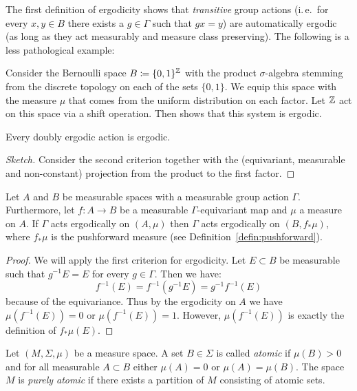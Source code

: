 The first definition of ergodicity shows that \emph{transitive} group actions (i.\,e.\ for every \(x,y \in B\) there exists a \(g \in \Gamma\) such that \(gx = y\)) are automatically ergodic (as long as they act measurably and measure class preserving). The following is a less pathological example:

\begin{bsp}
  Consider the Bernoulli space \(B \coloneqq \{0,1\}^{\mathbb{Z}}\) with the product \(\sigma\)-algebra stemming from the discrete topology on each of the sets \(\{0,1\}\). We equip this space with the measure \(\mu\) that comes from the uniform distribution on each factor. Let \(\mathbb{Z}\) act on this space via a shift operation. Then \textcite[Example 20.26]{Klenke} shows that this system is ergodic.
\end{bsp}

\begin{prop}
  \label{prop:coeff-ergodic}
  Every doubly ergodic action is ergodic.
\end{prop}

\begin{proof}[Sketch]
  Consider the second criterion together with the (equivariant, measurable and non-constant) projection from the product to the first factor.
\end{proof}

\begin{lemma}
  \label{lemma:ergodicity-pushforward}
  Let \(A\) and \(B\) be measurable spaces with a measurable group action \(\Gamma\). Furthermore, let \(f\colon A \to B\) be a measurable \(\Gamma\)-equivariant map and \(\mu\) a measure on \(A\). If \(\Gamma\) acts ergodically on \((A, \mu)\) then \(\Gamma\) acts ergodically on \((B, f_\ast \mu)\), where \(f_\ast \mu\) is the pushforward measure (see Definition~\ref{defin:pushforward}).
\end{lemma}

\begin{proof}
  We will apply the first criterion for ergodicity. Let \(E \subset B\) be measurable such that \(g^{-1} E = E\) for every \(g \in \Gamma\). Then we have:
  \[
    f^{-1}(E) = f^{-1}(g^{-1}E) = g^{-1}f^{-1}(E)
  \]
  because of the equivariance. Thus by the ergodicity on \(A\) we have \(\mu(f^{-1}(E))= 0\) or \(\mu(f^{-1}(E)) = 1\). However, \(\mu(f^{-1}(E))\) is exactly the definition of \(f_\ast\mu(E)\).
\end{proof}

\begin{defin}
  \label{defin:atomic}
  Let \((M, \Sigma, \mu)\) be a measure space. A set \(B \in \Sigma\) is called \emph{atomic} if \(\mu(B) > 0\) and for all measurable \(A \subset B\) either \(\mu(A) = 0\) or \(\mu(A) = \mu(B)\). The space \(M\) is \emph{purely atomic} if there exists a partition of \(M\) consisting of atomic sets.
\end{defin}

